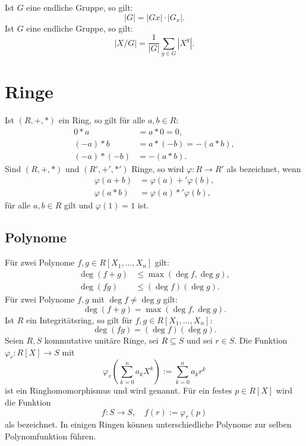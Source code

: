 \noindent
{}
Ist $G$ eine endliche Gruppe, so gilt:
\begin{equation}
|G| = |Gx|\cdot |G_x|.
\end{equation}
Ist $G$ eine endliche Gruppe, so gilt:
\begin{equation}
|X/G| = \frac{1}{|G|}\sum_{g\in G}|X^g|.
\end{equation}

\section{Ringe}
Ist $(R,+,*)$ ein Ring, so gilt für alle $a,b\in R$:
\begin{align}
0*a &= a*0 = 0,\\
(-a)*b &= a*(-b) = -(a*b),\\
(-a)*(-b) &= -(a*b).
\end{align}
{}
Sind $(R,+,*)$ und $(R',+',*')$ Ringe, so wird
$\varphi\colon R\to R'$ als 
bezeichnet, wenn
\begin{align}
\varphi(a+b) &= \varphi(a)+'\varphi(b),\\
\varphi(a*b) &= \varphi(a)*'\varphi(b),
\end{align}
für alle $a,b\in R$ gilt und $\varphi(1)=1$ ist.

\subsection{Polynome}
Für zwei Polynome $f,g\in R[X_1,\ldots,X_n]$ gilt:
\begin{align}
\deg(f+g)&\le \max(\deg f,\deg g),\\
\deg(fg)&\le (\deg f)(\deg g).
\end{align}
Für zwei Polynome $f,g$ mit $\deg f\ne\deg g$ gilt:
\begin{equation}
\deg(f+g) = \max(\deg f,\deg g).
\end{equation}
Ist $R$ ein Integritätsring, so gilt für $f,g\in R[X_1,\ldots,X_n]$:%
\begin{equation}
\deg(fg) = (\deg f)(\deg g).
\end{equation}
Seien $R,S$ kommutative unitäre Ringe, sei $R\subseteq S$
und sei $r\in S$.
Die Funktion $\varphi_r\colon R[X]\to S$ mit
\begin{equation}\textstyle
\varphi_r(\sum_{k=0}^n a_k X^k):=\sum_{k=0}^n a_k r^k 
\end{equation}
ist ein Ringhomomorphismus und wird
genannt. Für ein festes $p\in R[X]$ wird die Funktion
\begin{equation}
f\colon S\to S,\quad f(r):=\varphi_r(p)
\end{equation}
als  bezeichnet. In einigen Ringen können
unterschiedliche Polynome zur selben Polynomfunktion führen.

